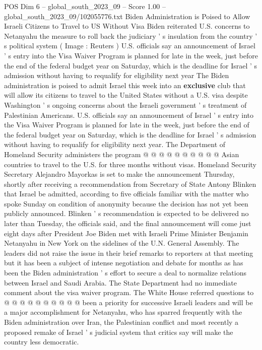 \begin{textsample}{POS Dim 6 – global\_south\_2023\_09 – Score 1.00 – global\_south\_2023\_09/102055776.txt}  \label{ex:f6_pos_383}
Biden Administration is Poised to Allow Israeli Citizens to Travel to US Without Visa Biden reiterated U.S. concerns to Netanyahu the measure to roll back the judiciary ' s insulation from the country ' s political system ( Image : Reuters ) U.S. officials say an announcement of Israel ' s entry into the Visa Waiver Program is planned for late in the week, just before the end of the federal budget year on Saturday, which is the deadline for Israel ' s admission without having to requalify for eligibility next year The Biden administration is poised to admit Israel this week into an \textbf{exclusive} club that will allow its citizens to travel to the United States without a U.S. visa despite Washington ' s ongoing concerns about the Israeli government ' s treatment of Palestinian Americans.
U.S. officials say an announcement of Israel ' s entry into the Visa Waiver Program is planned for late in the week, just before the end of the federal budget year on Saturday, which is the deadline for Israel ' s admission without having to requalify for eligibility next year.
The Department of Homeland Security administers the program @ @ @ @ @ @ @ @ @ @ Asian countries to travel to the U.S. for three months without visas.
Homeland Security Secretary Alejandro Mayorkas is set to make the announcement Thursday, shortly after receiving a recommendation from Secretary of State Antony Blinken that Israel be admitted, according to five officials familiar with the matter who spoke Sunday on condition of anonymity because the decision has not yet been publicly announced.
Blinken ' s recommendation is expected to be delivered no later than Tuesday, the officials said, and the final announcement will come just eight days after President Joe Biden met with Israeli Prime Minister Benjamin Netanyahu in New York on the sidelines of the U.N.
General Assembly.
The leaders did not raise the issue in their brief remarks to reporters at that meeting but it has been a subject of intense negotiation and debate for months as has been the Biden administration ' s effort to secure a deal to normalize relations between Israel and Saudi Arabia.
The State Department had no immediate comment about the visa waiver program.
The White House referred questions to @ @ @ @ @ @ @ @ @ @ been a priority for successive Israeli leaders and will be a major accomplishment for Netanyahu, who has sparred frequently with the Biden administration over Iran, the Palestinian conflict and most recently a proposed remake of Israel ' s judicial system that critics say will make the country less democratic.

\end{textsample}
